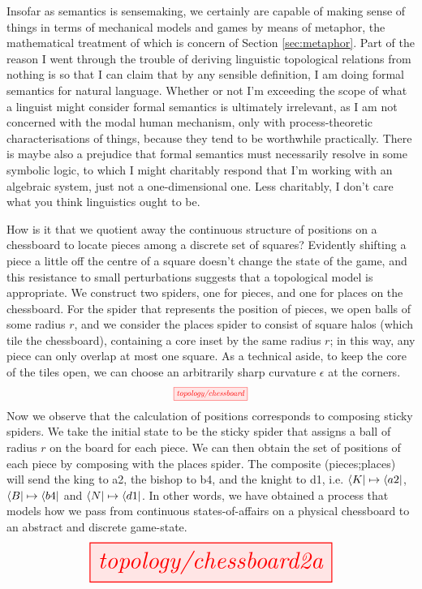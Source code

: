  Insofar as semantics is sensemaking, we certainly are capable of making sense of things in terms of mechanical models and games by means of metaphor, the mathematical treatment of which is concern of Section \ref{sec:metaphor}. Part of the reason I went through the trouble of deriving linguistic topological relations from nothing is so that I can claim that by any sensible definition, I am doing formal semantics for natural language. Whether or not I'm exceeding the scope of what a linguist might consider formal semantics is ultimately irrelevant, as I am not concerned with the modal human mechanism, only with process-theoretic characterisations of things, because they tend to be worthwhile practically. There is maybe also a prejudice that formal semantics must necessarily resolve in some symbolic logic, to which I might charitably respond that I'm working with an algebraic system, just not a one-dimensional one. Less charitably, I don't care what you think linguistics ought to be.

\newpage

\begin{myboxB}
\begin{example}\label{ex:chessboard}
How is it that we quotient away the continuous structure of positions on a chessboard to locate pieces among a discrete set of squares? Evidently shifting a piece a little off the centre of a square doesn't change the state of the game, and this resistance to small perturbations suggests that a topological model is appropriate. We construct two spiders, one for pieces, and one for places on the chessboard. For the spider that represents the position of pieces, we open balls of some radius $r$, and we consider the places spider to consist of square halos (which tile the chessboard), containing a core inset by the same radius $r$; in this way, any piece can only overlap at most one square. As a technical aside, to keep the core of the tiles open, we can choose an arbitrarily sharp curvature $\epsilon$ at the corners.
\[\scalebox{0.70}{\tikzfig{topology/chessboard}}\]
Now we observe that the calculation of positions corresponds to composing sticky spiders. We take the initial state to be the sticky spider that assigns a ball of radius $r$ on the board for each piece. We can then obtain the set of positions of each piece by composing with the places spider. The composite (pieces;places)
will send the king to a2, the bishop to b4, and the knight to d1, i.e. $\bra{K} \mapsto \bra{a2}$, $\bra{B} \mapsto \bra{b4}$ and $\bra{N} \mapsto \bra{d1}$. In other words, we have obtained a process that models how we pass from continuous states-of-affairs on a physical chessboard to an abstract and discrete game-state.
\[\resizebox{0.70\textwidth}{!}{\tikzfig{topology/chessboard2a}}\]
\end{example}
\end{myboxB}

